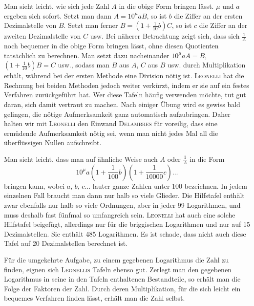 Man sieht leicht, wie sich jede Zahl $A$ in die obige Form bringen lässt. $\mu$ und $a$ ergeben sich sofort. Setzt man dann $A = 10^{\mu} a B$, so ist $b$ die Ziffer an der ersten Dezimalstelle von $B$. Setzt man ferner $B = \left(1+\frac{1}{10} b\right) C$, so ist $c$ die Ziffer an der zweiten Dezimalstelle von $C$ usw. Bei näherer Betrachtung zeigt sich, dass sich $\frac{1}{A}$ noch bequemer in die obige Form bringen lässt, ohne diesen Quotienten tatsächlich zu berechnen. Man setzt dazu nacheinander $10^{\mu} a A = B$, $\left(1+\frac{1}{10} b\right) B = C$ usw., sodass man $B$ aus $A$, $C$ aus $B$ usw. durch Multiplikation erhält, während bei der ersten Methode eine Division nötig ist. \textsc{Leonelli} hat die Rechnung bei beiden Methoden jedoch weiter verkürzt, indem er sie auf ein festes Verfahren zurückgeführt hat. Wer diese Tafeln häufig verwenden möchte, tut gut daran, sich damit vertraut zu machen. Nach einiger Übung wird es gewiss bald gelingen, die nötige Aufmerksamkeit ganz automatisch aufzubringen. Daher halten wir mit \textsc{Leonelli} den Einwand \textsc{Delambres} für voreilig, dass eine ermüdende Aufmerksamkeit nötig sei, wenn man nicht jedes Mal all die überflüssigen Nullen aufschreibt.

Man sieht leicht, dass man auf ähnliche Weise auch $A$ oder $\frac{1}{A}$ in die Form
\[
10^{\mu} a \left(1+\frac{1}{100} b\right)\left(1+\frac{1}{10000} c\right)\ldots
\]
bringen kann, wobei $a$, $b$, $c\ldots$ lauter ganze Zahlen unter 100 bezeichnen. In jedem einzelnen Fall braucht man dann nur halb so viele Glieder. Die Hilfstafel enthält zwar ebenfalls nur halb so viele Ordnungen, aber in jeder 99 Logarithmen, und muss deshalb fast fünfmal so umfangreich sein. \textsc{Leonelli} hat auch eine solche Hilfstafel beigefügt, allerdings nur für die briggischen Logarithmen und nur auf 15 Dezimalstellen. Sie enthält 485 Logarithmen. Es ist schade, dass nicht auch diese Tafel auf 20 Dezimalstellen berechnet ist.

Für die umgekehrte Aufgabe, zu einem gegebenen Logarithmus die Zahl zu finden, eignen sich \textsc{Leonellis} Tafeln ebenso gut. Zerlegt man den gegebenen Logarithmus in seine in den Tafeln enthaltenen Bestandteile, so erhält man die Folge der Faktoren der Zahl. Durch deren Multiplikation, für die sich leicht ein bequemes Verfahren finden lässt, erhält man die Zahl selbst.

